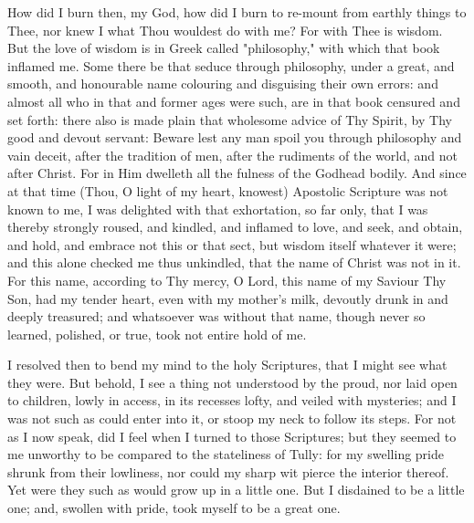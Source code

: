 \documentclass[b5paper,openright,12pt,twoside]{book}
\begin{document}
How did I burn then, my God, how did I burn to re-mount from earthly
things to Thee, nor knew I what Thou wouldest do with me? For with Thee
is wisdom. But the love of wisdom is in Greek called "philosophy,"
with which that book inflamed me. Some there be that seduce through
philosophy, under a great, and smooth, and honourable name colouring and
disguising their own errors: and almost all who in that and former ages
were such, are in that book censured and set forth: there also is
made plain that wholesome advice of Thy Spirit, by Thy good and devout
servant: Beware lest any man spoil you through philosophy and vain
deceit, after the tradition of men, after the rudiments of the world,
and not after Christ. For in Him dwelleth all the fulness of the Godhead
bodily. And since at that time (Thou, O light of my heart, knowest)
Apostolic Scripture was not known to me, I was delighted with that
exhortation, so far only, that I was thereby strongly roused, and
kindled, and inflamed to love, and seek, and obtain, and hold, and
embrace not this or that sect, but wisdom itself whatever it were; and
this alone checked me thus unkindled, that the name of Christ was not
in it. For this name, according to Thy mercy, O Lord, this name of
my Saviour Thy Son, had my tender heart, even with my mother's milk,
devoutly drunk in and deeply treasured; and whatsoever was without that
name, though never so learned, polished, or true, took not entire hold
of me.

I resolved then to bend my mind to the holy Scriptures, that I might see
what they were. But behold, I see a thing not understood by the proud,
nor laid open to children, lowly in access, in its recesses lofty, and
veiled with mysteries; and I was not such as could enter into it, or
stoop my neck to follow its steps. For not as I now speak, did I feel
when I turned to those Scriptures; but they seemed to me unworthy to be
compared to the stateliness of Tully: for my swelling pride shrunk from
their lowliness, nor could my sharp wit pierce the interior thereof. Yet
were they such as would grow up in a little one. But I disdained to be a
little one; and, swollen with pride, took myself to be a great one.
\end{document}
